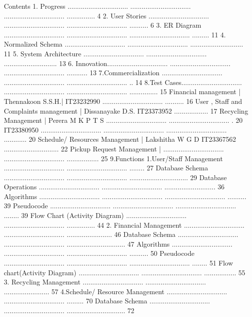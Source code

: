 \documentclass{article}
\begin{document}
Contents 
1. Progress ................................ ................................ ................................ ............... 4 
2. User Stories ................................ ................................ ................................ .......... 6 
3. ER Diagram ................................ ................................ ................................ ......... 11 
4. Normalized Schema ................................ ................................ ............................  11 
5. System Architecture ................................ ................................ ............................  13 
6. Innovation................................ ................................ ................................ ........... 13 
7.Commercialization ................................ ................................ ................................ .. 14 
8.Test Cases................................ ................................ ................................ ............... 15 
Financial management  | Thennakoon S.S.H.| IT23232990 ................................ .......... 16 
User , Staff  and Complaints management | Dissanayake D.S. IT23373952 ..................  17 
Recycling Management |  Perera M K P T S ................................ ................................ . 20 
IT23380950 ................................ ................................ ................................ ............ 20 
Schedule/ Resources Management | Lakshitha W G D IT23367562 .............................  22 
Pickup Request Management | ................................ ................................ ................. 25 
9.Functions  1.User/Staff Management ................................ ................................ ........ 27 
Database Schema ................................ ................................ ...............................  29 
Database Operations ................................ ................................ ...........................  36 
Algorithms ................................ ................................ ................................ .......... 39 
Pseudocode ................................ ................................ ................................ ........ 39 
Flow Chart (Activity Diagram) ................................ ................................ ............... 44 
2. Financial Management ................................ ................................ ........................  46 
Database Schema ................................ ................................ ...............................  47 
Algorithms ................................ ................................ ................................ .......... 50 
Pseudocode ................................ ................................ ................................ ........ 51 
Flow chart(Activity Diagram) ................................ ................................ ................. 55 
3. Recycling Management ................................ ................................ ........................  57 
4.Schedule/ Resource Management ................................ ................................ ......... 70 
Database Schema ................................ ................................ ...............................  72 
\end{document}
